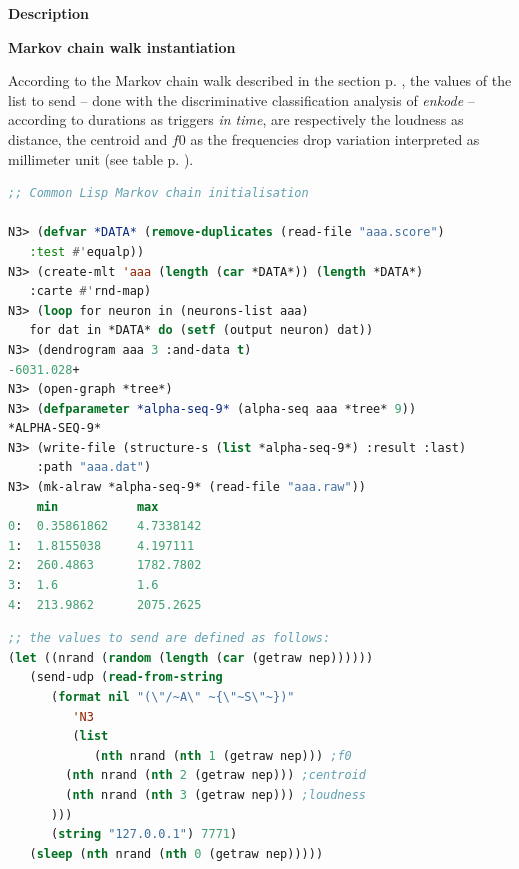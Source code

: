 

\noindent \textbf{{\large Description}}
\hrulefill

\bigskip

  \textbf{
  Markov chain walk instantiation }
  
  \smallskip
 
 According to the Markov chain walk described in the section \textsl{} p. \pageref{osc}, 
 the values of the list to send -- done with the discriminative classification analysis of \textsl{enkode} -- according to durations as triggers \textit{in time}, are respectively the loudness as distance, the centroid and $f0$ as the frequencies drop variation interpreted as millimeter unit (see table p. \pageref{tab:apc}).
  
 \bigskip
\begin{lstlisting}[basicstyle=\footnotesize\ttfamily,language=Lisp]
;; Common Lisp Markov chain initialisation

N3> (defvar *DATA* (remove-duplicates (read-file "aaa.score")
   :test #'equalp))
N3> (create-mlt 'aaa (length (car *DATA*)) (length *DATA*)
   :carte #'rnd-map)
N3> (loop for neuron in (neurons-list aaa)
   for dat in *DATA* do (setf (output neuron) dat))
N3> (dendrogram aaa 3 :and-data t)
-6031.028+
N3> (open-graph *tree*)
N3> (defparameter *alpha-seq-9* (alpha-seq aaa *tree* 9))
*ALPHA-SEQ-9*
N3> (write-file (structure-s (list *alpha-seq-9*) :result :last) 
    :path "aaa.dat")
N3> (mk-alraw *alpha-seq-9* (read-file "aaa.raw"))
    min           max
0:  0.35861862    4.7338142
1:  1.8155038     4.197111
2:  260.4863      1782.7802
3:  1.6           1.6
4:  213.9862      2075.2625
\end{lstlisting}

\smallskip

\begin{lstlisting}[basicstyle=\footnotesize\ttfamily,language=Lisp]
;; the values to send are defined as follows:
(let ((nrand (random (length (car (getraw nep))))))
   (send-udp (read-from-string 
      (format nil "(\"/~A\" ~{\"~S\"~})"
         'N3
         (list
            (nth nrand (nth 1 (getraw nep))) ;f0
	    (nth nrand (nth 2 (getraw nep))) ;centroid
	    (nth nrand (nth 3 (getraw nep))) ;loudness
	  ))) 
      (string "127.0.0.1") 7771)
   (sleep (nth nrand (nth 0 (getraw nep)))))
\end{lstlisting}

